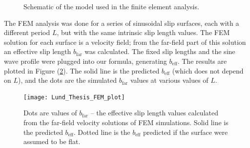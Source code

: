 \documentclass[12pt, a4paper, twoside, openright]{book}
\newcommand{\beff}{\ensuremath{b_{\mathrm{eff}}}}
\newcommand{\bfar}{\ensuremath{b_{\mathrm{far}}}}
\begin{document}
\begin{figure}[ht]
\centering
{}
\caption{Schematic of the model used in the finite element analysis.}\label{FEMmodel}
\end{figure}

\clearpage
The FEM analysis was done for a series of sinusoidal slip surfaces, each with a different period $L$, but with the same intrinsic slip length values.  The FEM solution for each surface is a velocity field; from the far-field part of this solution an effective slip length $\bfar$ was calculated.  The fixed slip lengths and the sine wave profile were plugged into our formula, generating $\beff$.  The results are plotted in Figure (\ref{FEMplot}).  The solid line is the predicted $\beff$ (which does not depend on $L$), and the dots are the simulated $\bfar$ values at various values of $L$.


\begin{figure}[ht]
\texttt{[image: Lund\_Thesis\_FEM\_plot]}
\caption{Dots are values of $\bfar$ -- the effective slip length values calculated from the far-field velocity solutions of FEM simulations.  Solid line is the predicted $\beff$.  Dotted line is the $\beff$ predicted if the surface were assumed to be flat. }\label{FEMplot}
\end{figure}
\end{document}
